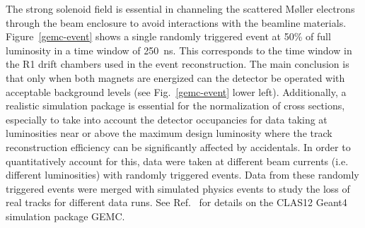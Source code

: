 \documentclass[final,3p]{elsarticle}
\begin{document}
\begin{twocolumn}
The strong solenoid field is essential in channeling the scattered M{\o}ller electrons through the beam enclosure to
avoid interactions with the beamline materials. Figure~\ref{gemc-event} shows a single randomly triggered event at
50\% of full luminosity in a time window of 250~ns. This corresponds to the time window in the R1 drift chambers
used in the event reconstruction. The main conclusion is that only when both magnets are energized can the detector
be operated with acceptable background levels (see Fig.~\ref{gemc-event} lower left). Additionally, a realistic
simulation package is essential for the normalization of cross sections, especially to take into account the detector
occupancies for data taking at luminosities near or above the maximum design luminosity where the track reconstruction
efficiency can be significantly affected by accidentals. In order to quantitatively account for this, data were taken at
different beam currents (i.e. different luminosities) with randomly triggered events. Data from these randomly
triggered events were merged with simulated physics events to study the loss of real tracks for different data runs.
See Ref.~\cite{GEMC} for details on the CLAS12 Geant4 simulation package GEMC.


\end{twocolumn}
\end{document}
